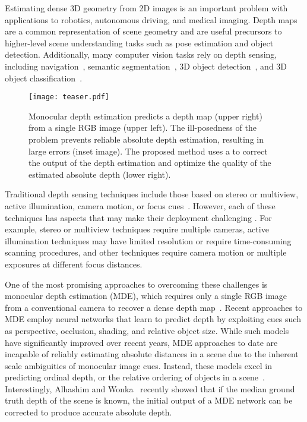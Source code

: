 Estimating dense 3D geometry from 2D images is an important problem with
applications to robotics, autonomous driving, and medical imaging. Depth maps
are a common representation of scene geometry and are useful precursors to
higher-level scene understanding tasks such as pose estimation and object
detection. Additionally, many computer vision tasks rely on depth sensing,
including navigation~\cite{geiger2013vision}, semantic
segmentation~\cite{gupta2013perceptual,ren2012rgb,silberman2012indoor}, 3D
object
detection~\cite{gupta2014learning,lin2013holistic,shrivastava2013building,song2014sliding,song2016deep},
and 3D object
classification~\cite{maturana2015voxnet,qi2016volumetric,wu20153d}.

\begin{figure}[t]
  \centering
  \texttt{[image: teaser.pdf]}
  \caption{Monocular depth estimation predicts a depth map (upper right) from a
    single RGB image (upper left). The ill-posedness of the problem prevents
    reliable absolute depth estimation, resulting in large errors (inset image).
    The proposed method uses a  to correct the output of the depth estimation and optimize the quality of the
    estimated absolute depth (lower right). }
  \label{fig:teaser}
\end{figure}

Traditional depth sensing techniques include those based on stereo or multiview,
active illumination, camera motion, or focus cues~\cite{szeliski2010computer}.
However, each of these techniques has aspects that may make their deployment
challenging . For example, stereo or multiview techniques require multiple
cameras, active illumination techniques may have limited resolution or require
time-consuming scanning procedures, and other techniques require camera motion
or multiple exposures at different focus distances.


One of the most promising approaches to overcoming these challenges is monocular
depth estimation (MDE), which requires only a single RGB image from a
conventional camera to recover a dense depth
map~\cite{Alhashim2018,Eigen2014,Fu2018,Laina2016,Saxena2006}. Recent approaches
to MDE employ neural networks that learn to predict depth by exploiting
 cues such as perspective, occlusion, shading, and relative
object size. While such models have significantly improved over recent years,
MDE approaches to date are incapable of reliably estimating absolute distances
in a scene due to the inherent scale ambiguities of monocular image cues.
Instead, these models excel in predicting ordinal depth, or the relative
ordering of objects in a scene~\cite{Eigen2014,Fu2018}. Interestingly, Alhashim
and Wonka~\cite{Alhashim2018} recently showed that if the median ground truth
depth of the scene is known, the initial output of a MDE network can be
corrected to produce accurate absolute depth.



